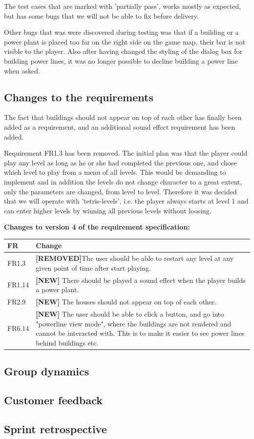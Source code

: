 	The test cases that are marked with 'partially pass', works mostly as expected, but has some bugs 
	that we will not be able to fix before delivery.

	Other bugs that was were discovered during testing was that if a building or a power plant is placed 
	too far on the right side on the game map, their bar is not visible to the player. Also after having 
	changed the styling of the dialog box for building power lines, it was no longer possible to decline 
	building a power line when asked.

\subsection{Changes to the requirements}

	The fact that buildings should not appear on top of each other has finally been added as a requirement, and an additional sound effect requirement has been added.

	Requirement FR1.3 has been removed. The initial plan was that the player could play any level as long as he or she had completed the previous one, and chose which level to play from a menu of all levels. This would be demanding to implement and in addition the levels do not change character to a great extent, only the parameters are changed, from level to level. Therefore it was decided that we will operate with 'tetris-levels', i.e. the player always starts at level 1 and can enter higher levels by winning all previous levels without loosing. 

	{\bf Changes to version 4 of the requirement specification:} \\
	\begin{tabular}{| p{1.5cm} | p{12cm} |}
		\hline
		\rowcolor{lightgray}
		{\bf FR} & {\bf Change} \\ \hline
		FR1.3 & {\bf \color{red}[REMOVED]}The user should be able to restart any level at any given point of time after start playing. \\ \hline
		FR1.14 & {\bf \color{green}[NEW]} There should be played a sound effect when the player builds a power plant. \\ \hline
		FR2.9 & {\bf \color{green}[NEW]} The houses should not appear on top of each other. \\ \hline
		FR6.14 & {\bf \color{green}[NEW]} The user should be able to click a button, and go into "powerline view mode", where the buildings are not rendered and cannot be interacted with. This is to make it easier to see power lines behind buildings etc. \\ \hline
	\end{tabular}

\subsection{Group dynamics}

\subsection{Customer feedback}

\subsection{Sprint retrospective}
